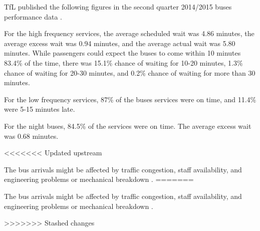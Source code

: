 \par TfL published the following figures in the second quarter 2014/2015 buses performance data \cite{buses_performance_report}.

\par For the high frequency services, the average scheduled wait was 4.86 minutes, the average excess wait was 0.94 minutes, and the average actual wait was 5.80 minutes. While passengers could expect the buses to come within 10 minutes 83.4\% of the time, there was 15.1\% chance of waiting for 10-20 minutes, 1.3\% chance of waiting for 20-30 minutes, and 0.2\% chance of waiting for more than 30 minutes.

\par For the low frequency services, 87\% of the buses services were on time, and 11.4\% were 5-15 minutes late.

\par For the night buses, 84.5\% of the services were on time. The average excess wait was 0.68 minutes.

<<<<<<< Updated upstream
\par The bus arrivals might be affected by traffic congestion, staff availability, and engineering problems or mechanical breakdown \cite{buses_performance_data}.
=======

\par The bus arrivals might be affected by traffic congestion, staff availability, and engineering problems or mechanical breakdown \cite{buses_performance_data}.

>>>>>>> Stashed changes
